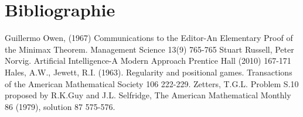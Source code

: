\documentclass[12pt, a4paper]{article}
\begin{document}
\section{Bibliographie}
\renewcommand{\section}[2]{}%
\begin{thebibliography}{10}
    Guillermo Owen, (1967) Communications to the Editor-An Elementary Proof of the Minimax Theorem. Management Science 13(9) 765-765
    Stuart Russell, Peter Norvig. Artificial Intelligence-A Modern Approach Prentice Hall (2010) 167-171
    Hales, A.W., Jewett, R.I. (1963). Regularity and positional games. Transactions of the American Mathematical Society 106 222-229.
    Zetters, T.G.L. Problem S.10 proposed by R.K.Guy and J.L. Selfridge, The American Mathematical Monthly 86 (1979), solution 87 575-576.
\end{thebibliography}
\end{document}
